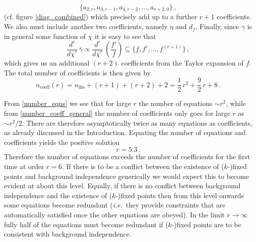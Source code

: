 \documentclass[11pt,a4paper]{article}
\numberwithin{figure}{section}
\numberwithin{equation}{section}
\newcommand\ie{\textit{i.e.}\ }
\begin{document}
\begin{equation}
\bigg\lbrace a_{2,r}, a_{3,r-1}, a_{4,r-2}, \dots, a_{r+2,0}   \bigg\rbrace \,,
\end{equation}
(cf. figure \ref{diag_combined}) which precisely add up to a further $r+1$ coefficients. We also must include another two coefficients, namely $\eta$ and $d_f$. 
Finally, since $\gamma$ is in general some function of $\chi$ it is easy to see that
\begin{equation}
\frac{d^r}{d \bar\chi^r} \, \bar{\gamma} \propto \frac{d^r}{d \bar\chi^r} \, \left( \frac{f'}{f}\right) \subseteq
\bigg\lbrace f, f', \dots, f^{(r+1)}   \bigg\rbrace \,,
\end{equation}
which gives us an additional $(r+2)$ coefficients from the Taylor expansion of $f$. The total number of coefficients is then given by
\begin{equation}
\label{number_coeff_general}
n_{\text{coeff}}(r) = n_{\text{lhs}} + (r+1) + (r+2) + 2  = \frac{1}{2} \, r^2 + \frac{9}{2} \, r + 8 \,.
\end{equation}

From \eqref{number_eqns} we see that for large $r$ the number of equations $\sim r^2$, while from \eqref{number_coeff_general} the number of coefficients only goes for large $r$ as $\sim r^2/2$. There are therefore asymptotically twice as many equations as coefficients, as already discussed in the Introduction. 
Equating the number of equations and coefficients yields the positive solution
\begin{equation}
r = 5.3 \,.
\end{equation}
Therefore the number of equations exceeds the number of coefficients for the first time at order $r=6$. If there is to be a conflict between the existence of ($k$-)fixed points and background independence generically we would expect this to become evident at about this level.  Equally, if there is no conflict between background independence and the existence of ($k$-)fixed points then from this level onwards some equations become redundant (\ie they provide constraints that are automatically satisfied once the other equations are obeyed). In the limit $r\to\infty$ fully half of the equations must become redundant if ($k$-)fixed points are to be consistent with background independence.
\end{document}
